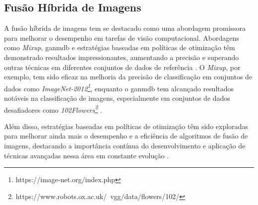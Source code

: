 \subsection{Fusão Híbrida de Imagens}\label{}

A fusão híbrida de imagens tem se destacado como uma abordagem promissora para melhorar o desempenho em tarefas de visão computacional. Abordagens como \textit{Mixup}, \gls{ganmdb} e estratégias baseadas em políticas de otimização têm demonstrado resultados impressionantes, aumentando a precisão e superando outras técnicas em diferentes conjuntos de dados de referência \cite{XU2023109347}. O \textit{Mixup}, por exemplo, tem sido eficaz na melhoria da precisão de classificação em conjuntos de dados como \textit{ImageNet-2012\footnote{https://image-net.org/index.php}}, enquanto o \gls{ganmdb} tem alcançado resultados notáveis na classificação de imagens, especialmente em conjuntos de dados desafiadores como \textit{102Flowers\footnote{https://www.robots.ox.ac.uk/~vgg/data/flowers/102/}} \cite{XU2023109347}. 

Além disso, estratégias baseadas em políticas de otimização têm sido exploradas para melhorar ainda mais o desempenho e a eficiência de algoritmos de fusão de imagens, destacando a importância contínua do desenvolvimento e aplicação de técnicas avançadas nessa área em constante evolução \cite{XU2023109347}.

